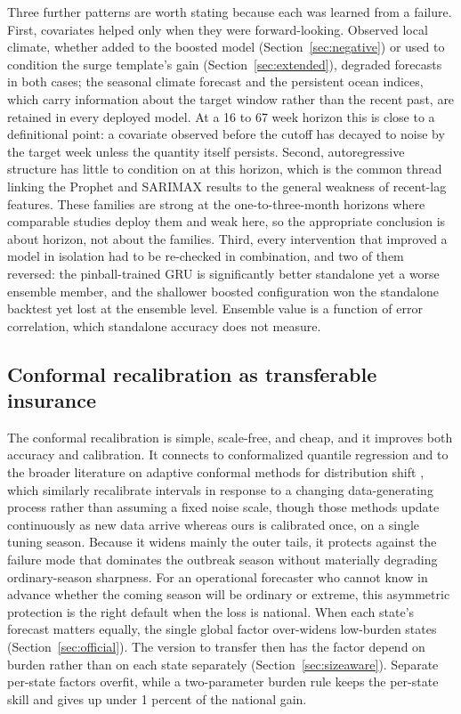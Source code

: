 \documentclass[11pt]{article}
\begin{document}
Three further patterns are worth stating because each was learned from a failure. First, covariates
helped only when they were forward-looking. Observed local climate, whether added to the boosted
model (Section~\ref{sec:negative}) or used to condition the surge template's gain
(Section~\ref{sec:extended}), degraded forecasts in both cases; the seasonal climate forecast and
the persistent ocean indices, which carry information about the target window rather than the
recent past, are retained in every deployed model. At a 16 to 67 week horizon this is close to a
definitional point: a covariate observed before the cutoff has decayed to noise by the target week
unless the quantity itself persists. Second, autoregressive structure has little to condition on at
this horizon, which is the common thread linking the Prophet and SARIMAX results to the general
weakness of recent-lag features. These families are strong at the one-to-three-month horizons where
comparable studies deploy them \citep{wu2025,sesay2026} and weak here, so the appropriate conclusion
is about horizon, not about the families. Third, every intervention that improved a model in
isolation had to be re-checked in combination, and two of them reversed: the pinball-trained GRU is
significantly better standalone yet a worse ensemble member, and the shallower boosted configuration
won the standalone backtest yet lost at the ensemble level. Ensemble value is a function of error
correlation, which standalone accuracy does not measure.

\subsection{Conformal recalibration as transferable insurance}
The conformal recalibration is simple, scale-free, and cheap, and it improves both accuracy and
calibration. It connects to conformalized quantile regression \citep{romano2019} and to the broader
literature on adaptive conformal methods for distribution shift \citep{gibbs2021,zaffran2022}, which
similarly recalibrate intervals in response to a changing data-generating process rather than
assuming a fixed noise scale, though those methods update continuously as new data arrive whereas
ours is calibrated once, on a single tuning season. Because it widens mainly the outer
tails, it protects against the failure mode that dominates the outbreak season without materially
degrading ordinary-season sharpness. For an operational forecaster who cannot know in advance whether
the coming season will be ordinary or extreme, this asymmetric protection is the right default
when the loss is national. When each state's forecast matters equally, the single global factor
over-widens low-burden states (Section~\ref{sec:official}). The version to transfer then has the
factor depend on burden rather than on each state separately (Section~\ref{sec:sizeaware}).
Separate per-state factors overfit, while a two-parameter burden rule keeps the per-state skill and
gives up under 1 percent of the national gain.
\end{document}
